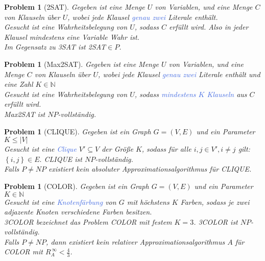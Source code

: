 \documentclass[11pt]{scrartcl}
\newcommand{\tcol}[1]{\textcolor{RoyalBlue}{#1}}
\newcommand{\set}[1]{\left\lbrace #1\right\rbrace}
\theoremstyle{break}
\newtheorem{prob}[satz]{Problem}
\begin{document}
    \begin{prob}[2SAT]
        Gegeben ist eine Menge $U$ von Variablen, und eine Menge $C$ von Klauseln über $U$, wobei jede Klausel \tcol{genau zwei} Literale enthält.\\
        Gesucht ist eine Wahrheitsbelegung von $U$, sodass $C$ erfüllt wird.
        Also in jeder Klausel mindestens eine Variable Wahr ist.\\
        Im Gegensatz zu 3SAT ist 2SAT$\in P$.
    \end{prob}

    \begin{prob}[Max2SAT]
        Gegeben ist eine Menge $U$ von Variablen, und eine Menge $C$ von Klauseln über $U$, wobei jede Klausel \tcol{genau zwei} Literale enthält und eine Zahl $K\in\mathbb{N}$\\
        Gesucht ist eine Wahrheitsbelegung von $U$, sodass \tcol{mindestens $K$ Klauseln} aus $C$ erfüllt wird.\\
        Max2SAT ist $NP$-vollständig.
    \end{prob}

    \begin{prob}[CLIQUE]
        Gegeben ist ein Graph $G=(V,E)$ und ein Parameter $K\leq |V|$\\
        Gesucht ist eine \tcol{Clique} $V'\subseteq V$ der Größe $K$, sodass für alle $i,j\in V', i\neq j$ gilt: $\set{i,j}\in E.$
        CLIQUE ist $NP$-vollständig.\\
        Falls $P\neq NP$ existiert kein absoluter Approximationsalgorithmus für CLIQUE\@.
    \end{prob}

    \begin{prob}[COLOR]
        Gegeben ist ein Graph $G=(V,E)$ und ein Parameter $K\in\mathbb{N}$\\
        Gesucht ist eine \tcol{Knotenfärbung} von $G$ mit höchstens $K$ Farben, sodass je zwei adjazente Knoten verschiedene Farben besitzen.\\
        3COLOR bezeichnet das Problem COLOR mit festem $K=3$.
        3COLOR ist $NP$-vollständig.\\
        Falls $P\neq NP$, dann existiert kein relativer Approximationsalgorithmus $A$ für COLOR mit $R^{\,\infty}_A<\frac{4}{3}$.
    \end{prob}
\end{document}
